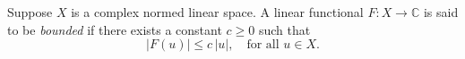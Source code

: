 Suppose $X$ is a complex normed linear space. A linear functional $F: X \to \mathbb{C}$ is said to be \emph{bounded} if there exists a constant $c \geq 0$ such that
$$|F(u)| \leq c \, |u|, \quad \text{for all } u \in X.$$
